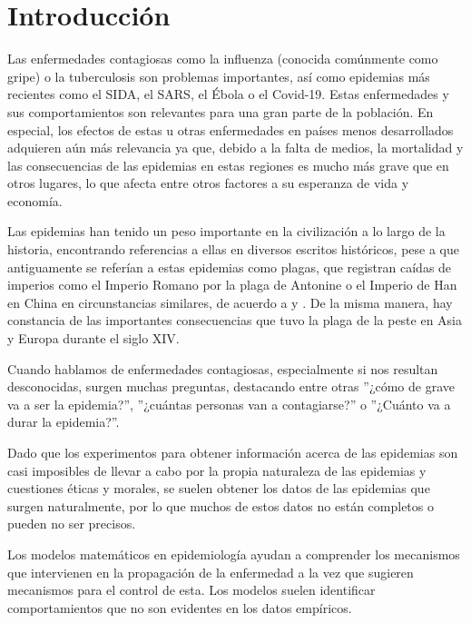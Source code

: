 
\chapter*{Introducción}

Las enfermedades contagiosas como la influenza (conocida comúnmente como gripe) o la tuberculosis son problemas importantes, así como epidemias más recientes como el SIDA, el SARS, el Ébola o el Covid-19. Estas enfermedades y sus comportamientos son relevantes para una gran parte de la población. En especial, los efectos de estas u otras enfermedades en países menos desarrollados adquieren aún más relevancia ya que, debido a la falta de medios, la mortalidad y las consecuencias de las epidemias en estas regiones es mucho más grave que en otros lugares, lo que afecta entre otros factores a su esperanza de vida y economía.

Las epidemias han tenido un peso importante en la civilización a lo largo de la historia, encontrando referencias a ellas en diversos escritos históricos, pese a que antiguamente se referían a estas epidemias como plagas, que registran caídas de imperios como el Imperio Romano por la plaga de Antonine o el Imperio de Han en China en circunstancias similares, de acuerdo a \cite{Sommerfeld2003} y \cite{duncan-jones_1996}. De la misma manera, hay constancia de las importantes consecuencias que tuvo la plaga de la peste en Asia y Europa durante el siglo XIV.

Cuando hablamos de enfermedades contagiosas, especialmente si nos resultan desconocidas, surgen muchas preguntas, destacando entre otras ''¿cómo de grave va a ser la epidemia?'', ''¿cuántas personas van a contagiarse?'' o ''¿Cuánto va a durar la epidemia?''.

Dado que los experimentos para obtener información acerca de las epidemias son casi imposibles de llevar a cabo por la propia naturaleza de las epidemias y cuestiones éticas y morales, se suelen obtener los datos de las epidemias que surgen naturalmente, por lo que muchos de estos datos no están completos o pueden no ser precisos.

Los modelos matemáticos en epidemiología ayudan a comprender los mecanismos que intervienen en la propagación de la enfermedad a la vez que sugieren mecanismos para el control de esta. Los modelos suelen identificar comportamientos que no son evidentes en los datos empíricos.


